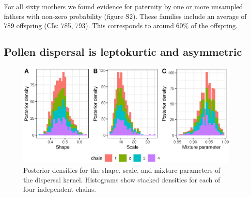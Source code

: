 \documentclass[10pt, a4paper, twocolumn]{article} %
\begin{document}
For all sixty mothers we found evidence for paternity by one or more unsampled fathers with non-zero probability (figure S2).
These families include an average of 789 offspring (CIs: 785, 793).
This corresponds to around 60\% of the offspring.

\subsection{Pollen dispersal is leptokurtic and asymmetric}

\begin{figure}
    \centering
    \includegraphics{fig-posterior_distributions.eps}
    \caption{
        Posterior densities for the shape, scale, and mixture parameters of the dispersal kernel.
        Histograms show stacked densities for each of four independent chains.
    }
    \label{fig:posterior_summaries}
\end{figure}
\end{document}
